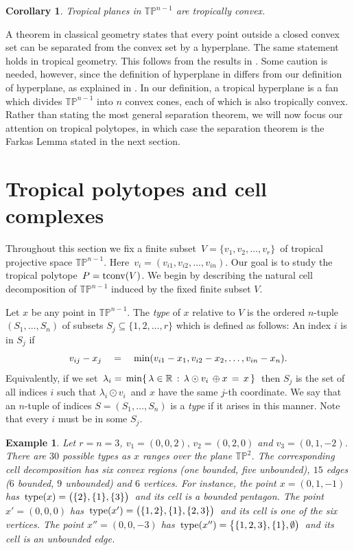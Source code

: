 \documentclass[11pt]{amsart}
\newtheorem{ex}[thm]{Example}
\newtheorem{cor}[thm]{Corollary}
\newcommand{\RR}{\mathbb{R}}
\newcommand{\TP}{\mathbb{TP}}
\begin{document}
\begin{cor} \label{planesconvex}
Tropical planes in $\TP^{n-1}$ are tropically convex.
\end{cor}

A theorem in classical geometry states
that every point outside a closed convex set
can be separated from the convex set by a hyperplane.
The same statement holds in tropical geometry.
This follows from the results in \cite{CGQ}.
Some caution is needed, however, since
the definition of hyperplane in \cite{CGQ}
differs from our definition of hyperplane,
as explained in \cite{RGST}. In our definition,
a tropical hyperplane is a fan which divides
$\TP^{n-1}$ into $n$ convex cones,
each of which is also tropically convex.
Rather than stating the most general
separation theorem, we will now
focus our attention on tropical polytopes,
in which case the separation theorem is
the Farkas Lemma stated in the next section.

\section{Tropical polytopes and cell complexes}\label{polytopes}

Throughout this section we fix a finite subset
$\, V = \{v_1,v_2,\ldots,v_r \} \,$ of tropical
projective space $\TP^{n-1}$. Here
$\,v_i = (v_{i1},v_{i2},\ldots,v_{in})$.
Our goal is to
study the tropical polytope $\, P =  {\rm tconv}(V)$.
We begin by describing the natural cell decomposition
of $\TP^{n-1}$ induced by the fixed finite subset $V$.

Let $x$ be any point in $\TP^{n-1}$.
The \emph{type} of $x$ relative to $V$ is the ordered $n$-tuple
$(S_1,\ldots,S_n)$ of subsets $S_j \subseteq \{1,2,\ldots,r\}$
which is defined as follows: An index $i$ is in $S_j$ if
$$ v_{ij} - x_j \quad = \quad {\rm min}
(  v_{i1} - x_1,  v_{i2} - x_2, \ldots,  v_{in} - x_n ). $$
Equivalently, if we set  $\,\lambda_i
= \, {\rm min}\{ \, \lambda \in \RR \, : \, \lambda \odot v_i \, \oplus x \, = \, x \,\}\,$
then $S_j$ is the set of all indices $i$ such that
$ \lambda_i \odot v_i \,$ and $x$ have the same $j$-th coordinate. We say that 
an $n$-tuple of indices $S=(S_1,\ldots,S_n)$ is a \emph{type} if it arises in this manner. Note that 
every $i$ must be in some $S_j$. 


\begin{ex} \rm
Let $r=n=3$, $v_1 = (0,0,2),\,
v_2 = (0,2,0)$ and $v_3 = (0,1,-2)$.
There are $30$ possible types as $x$ ranges over the
plane $\TP^2$. The corresponding cell decomposition
has six convex regions (one bounded, five unbounded),
$15$ edges ($6$ bounded, $9$ unbounded)
and $6$ vertices. For instance, the point
$x = (0,1,-1)$ has $\, {\rm type}(x) = \bigl( \{2\}, \{1\}, \{3\} \bigr)\,$
and its cell is a bounded pentagon.
The point $ x'= (0,0,0)$ has
$\, {\rm type}(x') =  \bigl( \{1,2\}, \{1\}, \{2,3\} \bigr)\,$
and its cell is one of the six vertices.
The point $x'' = (0,0,-3)$ has
$\, {\rm type}(x'') = \bigl\{ \{1,2,3\}, \{1\}, \emptyset \bigr)\,$
and its cell is an unbounded edge.
\end{ex}
\end{document}
